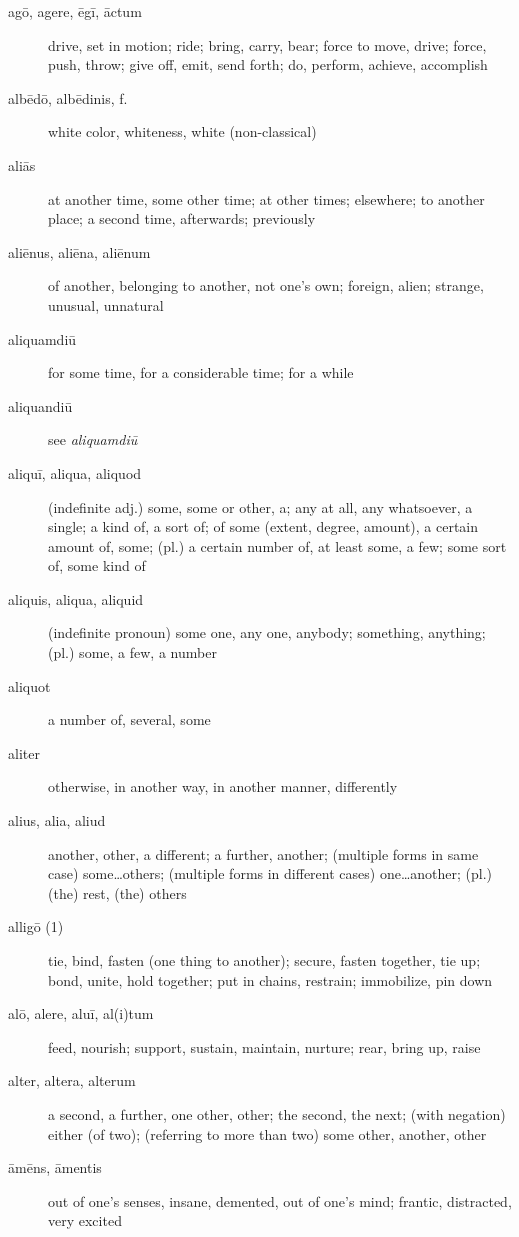 \begin{description}
    \item[agō, agere, ēgī, āctum] \marginnote{*}drive, set in motion; ride; bring, carry, bear; force to move, drive; force, push, throw; give off, emit, send forth; do, perform, achieve, accomplish
    \item[albēdō, albēdinis, f.] white color, whiteness, white (non-classical)
    \item[aliās] at another time, some other time; at other times; elsewhere; to another place; a second time, afterwards; previously
    \item[aliēnus, aliēna, aliēnum] \marginnote{*}of another, belonging to another, not one's own; foreign, alien; strange, unusual, unnatural
    \item[aliquamdiū] for some time, for a considerable time; for a while
    \item[aliquandiū] see \textit{aliquamdiū}
    \item[aliquī, aliqua, aliquod] \marginnote{*}(indefinite adj.) some, some or other, a; any at all, any whatsoever, a single; a kind of, a sort of; of some (extent, degree, amount), a certain amount of, some; (pl.) a certain number of, at least some, a few; some sort of, some kind of
    \item[aliquis, aliqua, aliquid] \marginnote{*}(indefinite pronoun) some one, any one, anybody; something, anything; (pl.) some, a few, a number
    \item[aliquot] a number of, several, some
    \item[aliter] \marginnote{*}otherwise, in another way, in another manner, differently
    \item[alius, alia, aliud] \marginnote{*}another, other, a different; a further, another; (multiple forms in same case) some\dots others; (multiple forms in different cases) one\dots another; (pl.) (the) rest, (the) others
    \item[alligō (1)] tie, bind, fasten (one thing to another); secure, fasten together, tie up; bond, unite, hold together; put in chains, restrain; immobilize, pin down
    \item[alō, alere, aluī, al(i)tum] \marginnote{*}feed, nourish; support, sustain, maintain, nurture; rear, bring up, raise
    \item[alter, altera, alterum] \marginnote{*}a second, a further, one other, other; the second, the next; (with negation) either (of two); (referring to more than two) some other, another, other
    \item[āmēns, āmentis] out of one's senses, insane, demented, out of one's mind; frantic, distracted, very excited

\end{description}
